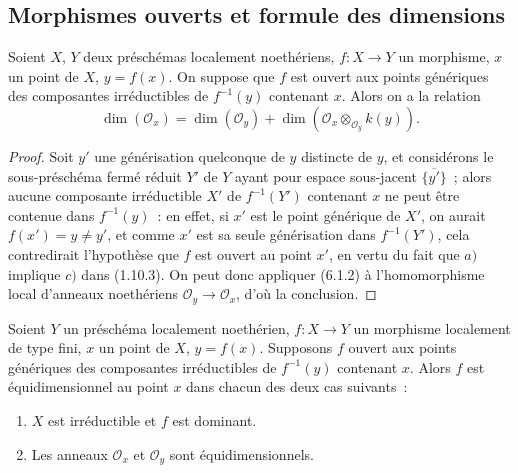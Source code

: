 \subsection{Morphismes ouverts et formule des dimensions}
\label{subsection:IV.14.2-fr}

\begin{theorem}[14.2.1]
Soient $X$, $Y$ deux préschémas localement noethériens, $f:X\to Y$ un morphisme,
$x$ un point de $X$, $y=f(x)$. On suppose que $f$ est ouvert aux points génériques
des composantes irréductibles de $f^{-1}(y)$ contenant $x$. Alors on a la relation
\begin{equation}
\tag{14.2.1.1}
\label{IV.14.2.1.1-fr}
  \dim(\mathcal O_x)=\dim(\mathcal O_y)+
  \dim(\mathcal O_x\otimes_{\mathcal O_y}k(y)).
\end{equation}
\end{theorem}

\begin{proof}
Soit $y'$ une générisation quelconque de $y$ distincte de $y$, et considérons le
sous-préschéma fermé réduit $Y'$ de $Y$ ayant pour espace sous-jacent
$\overline{\{y'\}}$~; alors aucune composante irréductible $X'$ de $f^{-1}(Y')$
contenant $x$ ne peut être contenue dans $f^{-1}(y)$~: en effet, si $x'$ est le
point générique de $X'$, on aurait $f(x')=y\ne y'$, et comme $x'$ est sa seule
générisation dans $f^{-1}(Y')$, cela contredirait l'hypothèse que $f$ est ouvert
au point $x'$, en vertu du fait que $a)$ implique $c)$ dans (1.10.3). On peut donc
appliquer (6.1.2) à l'homomorphisme local d'anneaux noethériens
$\mathcal O_y\to\mathcal O_x$, d'où la conclusion.
\end{proof}

\begin{corollary}[14.2.2]
\label{IV.14.2.2-fr}
Soient $Y$ un préschéma localement noethérien, $f:X\to Y$ un morphisme localement
de type fini, $x$ un point de $X$, $y=f(x)$. Supposons $f$ ouvert aux points
génériques des composantes irréductibles de $f^{-1}(y)$ contenant $x$. Alors $f$
est équidimensionnel au point $x$ dans chacun des deux cas suivants~:
\begin{enumerate}[label=(\roman*)]
  \item $X$ est irréductible et $f$ est dominant.
  \item Les anneaux $\mathcal O_x$ et $\mathcal O_y$ sont équidimensionnels.
\end{enumerate}
\end{corollary}

